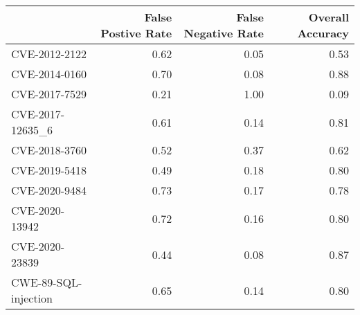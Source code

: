 \begin{tabular}{lrrr}
\toprule
{} &  False Postive Rate &  False Negative Rate &  Overall Accuracy \\
\midrule
CVE-2012-2122        &                0.62 &                 0.05 &              0.53 \\
CVE-2014-0160        &                0.70 &                 0.08 &              0.88 \\
CVE-2017-7529        &                0.21 &                 1.00 &              0.09 \\
CVE-2017-12635\_6     &                0.61 &                 0.14 &              0.81 \\
CVE-2018-3760        &                0.52 &                 0.37 &              0.62 \\
CVE-2019-5418        &                0.49 &                 0.18 &              0.80 \\
CVE-2020-9484        &                0.73 &                 0.17 &              0.78 \\
CVE-2020-13942       &                0.72 &                 0.16 &              0.80 \\
CVE-2020-23839       &                0.44 &                 0.08 &              0.87 \\
CWE-89-SQL-injection &                0.65 &                 0.14 &              0.80 \\
\bottomrule
\end{tabular}
